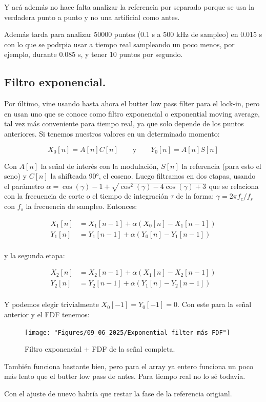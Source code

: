 Y acá además no hace falta analizar la referencia por separado porque se usa la verdadera punto a punto y no una artificial como antes.

Además tarda para analizar 50000 puntos (0.1 s a 500 kHz de sampleo) en 0.015 s con lo que se podrpia usar a tiempo real sampleando un poco menos, por ejemplo, durante 0.085 s, y tener 10 puntos por segundo.

\subsection*{Filtro exponencial.}
Por último, vine usando hasta ahora el butter low pass filter para el lock-in, pero en \cite{harvieOLIAOpensourceDigital2023} usan uno que se conoce como filtro exponencial o exponential moving average, tal vez más conveniente para tiempo real, ya que solo depende de los puntos anteriores. Si tenemos nuestros valores en un determinado momento:

\begin{equation}
	X_0[n] = A[n]C[n] \qquad \text{y} \qquad Y_0[n] = A[n]S[n]
\end{equation}

Con $A[n]$ la señal de interés con la modulación, $S[n]$ la referencia (para esto el seno) y $C[n]$ la shifteada 90°, el coseno. Luego filtramos en dos etapas, usando el parámetro $\alpha=\cos(\gamma)-1+\sqrt{\cos^2(\gamma)-4\cos(\gamma)+3}$ que se relaciona con la frecuencia de corte o el tiempo de integración $\tau$ de la forma: $\gamma=2\pi f_c/f_s$ con $f_s$ la frecuencia de sampleo. Entonces:

\begin{align}
	X_1[n] &= X_1[n-1] + \alpha(X_0[n]-X_1[n-1]) \\
	Y_1[n] &= Y_1[n-1] + \alpha(Y_0[n]-Y_1[n-1]) \\
\end{align}

y la segunda etapa: 

\begin{align}
		X_2[n] &= X_2[n-1] + \alpha(X_1[n]-X_2[n-1]) \\
		Y_2[n] &= Y_2[n-1] + \alpha(Y_1[n]-Y_2[n-1]) \\
\end{align}

Y podemos elegir trivialmente $X_0[-1]=Y_0[-1]=0$. Con este para la señal anterior y el FDF tenemos: 

\begin{figure}[th!]
	\centering
	\texttt{[image: "Figures/09\_06\_2025/Exponential filter más FDF"]}
	\caption{Filtro exponencial + FDF de la señal completa.}
	\label{fig:exponential-filter-mas-fdf}
\end{figure}


También funciona bastante bien, pero para el array ya entero funciona un poco más lento que el butter low pass de antes. Para tiempo real no lo sé todavía.  

Con el ajuste de nuevo habría que restar la fase de la referencia origianl.